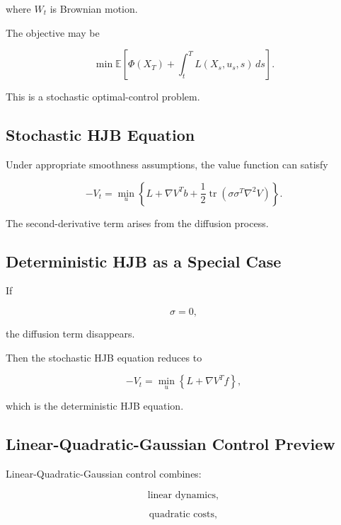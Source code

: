 where \(W_t\) is Brownian motion.

The objective may be

\[
\boxed{
\min
\mathbb{E}
\left[
\Phi(X_T)
+
\int_t^T
L(X_s,u_s,s)\,ds
\right].
}
\]

This is a stochastic optimal-control problem.

\subsection{Stochastic HJB Equation}
\label{subsec:stochastic-hjb}

Under appropriate smoothness assumptions, the value function can satisfy

\[
\boxed{
-
V_t
=
\min_u
\left\{
L
+
\nabla V^T b
+
\frac12
\operatorname{tr}
\left(
\sigma\sigma^T
\nabla^2V
\right)
\right\}.
}
\]

The second-derivative term arises from the diffusion process.

\subsection{Deterministic HJB as a Special Case}
\label{subsec:deterministic-hjb-special-case}

If

\[
\boxed{
\sigma=0,
}
\]

the diffusion term disappears.

Then the stochastic HJB equation reduces to

\[
\boxed{
-
V_t
=
\min_u
\left\{
L
+
\nabla V^Tf
\right\},
}
\]

which is the deterministic HJB equation.

\subsection{Linear-Quadratic-Gaussian Control Preview}
\label{subsec:lqg-preview}

Linear-Quadratic-Gaussian control combines:

\[
\boxed{
\text{linear dynamics},
}
\]

\[
\boxed{
\text{quadratic costs},
}
\]


